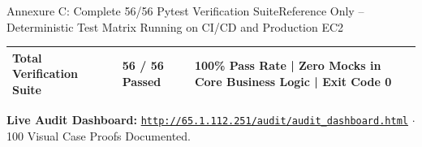 \documentclass[aspectratio=169,10pt]{beamer}
\begin{document}
\begin{frame}{Annexure C: Complete 56/56 Pytest Verification Suite}{Reference Only -- Deterministic Test Matrix Running on CI/CD and Production EC2}
\begin{tcolorbox}[academicbox]
{\begin{tabularx}{\linewidth}{p{3.0cm}p{1.4cm}X}
      \midrule
      \textbf{Total Verification Suite} & \textbf{56 / 56 Passed} & \textcolor{successgreen}{\textbf{100\% Pass Rate | Zero Mocks in Core Business Logic | Exit Code 0}} \\
      \bottomrule
    \end{tabularx}
    }
  \end{tcolorbox}
  \vspace{0.06cm}
  \begin{center}
    {\fontsize{5.5pt}{6.8pt}\selectfont
    \textbf{Live Audit Dashboard:} \href{http://65.1.112.251/audit/audit_dashboard.html}{\textcolor{airtelred}{\texttt{http://65.1.112.251/audit/audit\_dashboard.html}}} $\cdot$ 100 Visual Case Proofs Documented.
    }
  \end{center}
\end{frame}
\end{document}
